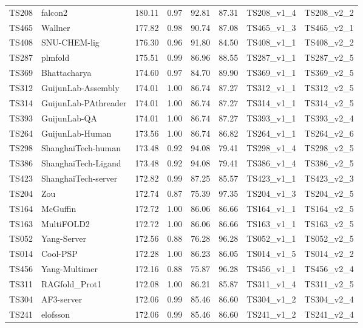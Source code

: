 \begin{longtable}{llllllll}
TS208 & falcon2 & 180.11 & 0.97 & 92.81 & 87.31 & TS208\_v1\_4 & TS208\_v2\_2 \\ 
TS465 & Wallner & 177.82 & 0.98 & 90.74 & 87.08 & TS465\_v1\_3 & TS465\_v2\_1 \\ 
TS408 & SNU-CHEM-lig & 176.30 & 0.96 & 91.80 & 84.50 & TS408\_v1\_1 & TS408\_v2\_2 \\ 
TS287 & plmfold & 175.51 & 0.99 & 86.96 & 88.55 & TS287\_v1\_1 & TS287\_v2\_5 \\ 
TS369 & Bhattacharya & 174.60 & 0.97 & 84.70 & 89.90 & TS369\_v1\_1 & TS369\_v2\_5 \\ 
TS312 & GuijunLab-Assembly & 174.01 & 1.00 & 86.74 & 87.27 & TS312\_v1\_1 & TS312\_v2\_5 \\ 
TS314 & GuijunLab-PAthreader & 174.01 & 1.00 & 86.74 & 87.27 & TS314\_v1\_1 & TS314\_v2\_5 \\ 
TS393 & GuijunLab-QA & 174.01 & 1.00 & 86.74 & 87.27 & TS393\_v1\_1 & TS393\_v2\_4 \\ 
TS264 & GuijunLab-Human & 173.56 & 1.00 & 86.74 & 86.82 & TS264\_v1\_1 & TS264\_v2\_6 \\ 
TS298 & ShanghaiTech-human & 173.48 & 0.92 & 94.08 & 79.41 & TS298\_v1\_4 & TS298\_v2\_5 \\ 
TS386 & ShanghaiTech-Ligand & 173.48 & 0.92 & 94.08 & 79.41 & TS386\_v1\_4 & TS386\_v2\_5 \\ 
TS423 & ShanghaiTech-server & 172.82 & 0.99 & 87.25 & 85.57 & TS423\_v1\_1 & TS423\_v2\_3 \\ 
TS204 & Zou & 172.74 & 0.87 & 75.39 & 97.35 & TS204\_v1\_3 & TS204\_v2\_5 \\ 
TS164 & McGuffin & 172.72 & 1.00 & 86.06 & 86.66 & TS164\_v1\_1 & TS164\_v2\_5 \\ 
TS163 & MultiFOLD2 & 172.72 & 1.00 & 86.06 & 86.66 & TS163\_v1\_1 & TS163\_v2\_5 \\ 
TS052 & Yang-Server & 172.56 & 0.88 & 76.28 & 96.28 & TS052\_v1\_1 & TS052\_v2\_5 \\ 
TS014 & Cool-PSP & 172.28 & 1.00 & 86.23 & 86.05 & TS014\_v1\_5 & TS014\_v2\_2 \\ 
TS456 & Yang-Multimer & 172.16 & 0.88 & 75.87 & 96.28 & TS456\_v1\_1 & TS456\_v2\_4 \\ 
TS311 & RAGfold\_Prot1 & 172.08 & 1.00 & 86.21 & 85.87 & TS311\_v1\_4 & TS311\_v2\_5 \\ 
TS304 & AF3-server & 172.06 & 0.99 & 85.46 & 86.60 & TS304\_v1\_2 & TS304\_v2\_4 \\ 
TS241 & elofsson & 172.06 & 0.99 & 85.46 & 86.60 & TS241\_v1\_2 & TS241\_v2\_4 \\ 

\end{longtable}
